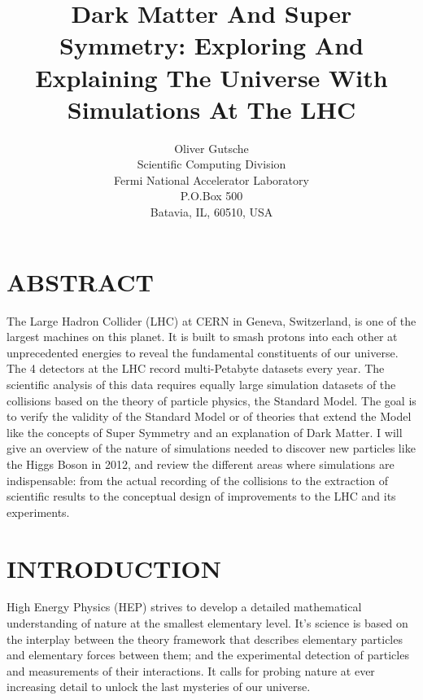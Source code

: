 \documentclass{wscpaperproc}
\theoremstyle{wsc}
\begin{document}
%
%

\title{Dark Matter And Super Symmetry: Exploring And Explaining The Universe With Simulations At The LHC}

\author{Oliver Gutsche\\ [12pt]
Scientific Computing Division \\
Fermi National Accelerator Laboratory\\
P.O.Box 500\\
Batavia, IL, 60510, USA\\
}

\maketitle

\section*{ABSTRACT}
The Large Hadron Collider (LHC) at CERN in Geneva, Switzerland, is one of the largest machines on this planet. It is built to smash protons into each other at unprecedented energies to reveal the fundamental constituents of our universe. The 4 detectors at the LHC record multi-Petabyte datasets every year. The scientific analysis of this data requires equally large simulation datasets of the collisions based on the theory of particle physics, the Standard Model. The goal is to verify the validity of the Standard Model or of theories that extend the Model like the concepts of Super Symmetry and an explanation of Dark Matter. I will give an overview of the nature of simulations needed to discover new particles like the Higgs Boson in 2012, and review the different areas where simulations are indispensable: from the actual recording of the collisions to the extraction of scientific results to the conceptual design of improvements to the LHC and its experiments.

\section{INTRODUCTION}
\label{sec:intro}
High Energy Physics (HEP) strives to develop a detailed mathematical understanding of nature at the smallest elementary level. It’s science is based on the interplay between the theory framework that describes elementary particles and elementary forces between them; and the experimental detection of particles and measurements of their interactions. It calls for probing nature at ever increasing detail to unlock the last mysteries of our universe.
\end{document}
